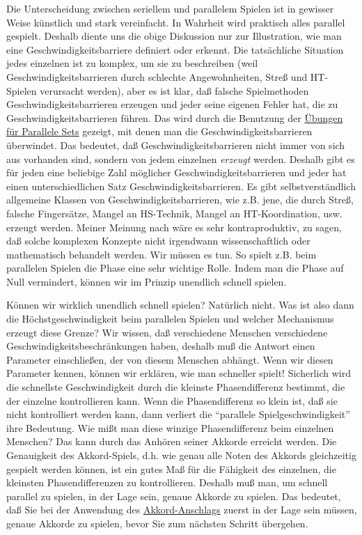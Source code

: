 Die Unterscheidung zwischen seriellem und parallelem Spielen ist in gewisser Weise künstlich und stark vereinfacht.
In Wahrheit wird praktisch alles parallel gespielt.
Deshalb diente uns die obige Diskussion nur zur Illustration, wie man eine Geschwindigkeitsbarriere definiert oder erkennt.
Die tatsächliche Situation jedes einzelnen ist zu komplex, um sie zu beschreiben (weil Geschwindigkeitsbarrieren durch schlechte Angewohnheiten, Streß und HT-Spielen verursacht werden), aber es ist klar, daß falsche Spielmethoden Geschwindigkeitsbarrieren erzeugen und jeder seine eigenen Fehler hat, die zu Geschwindigkeitsbarrieren führen.
Das wird durch die Benutzung der \hyperlink{c1iii7b}{Übungen für Parallele Sets} gezeigt, mit denen man die Geschwindigkeitsbarrieren überwindet.
Das bedeutet, daß Geschwindigkeitsbarrieren nicht immer von sich aus vorhanden sind, sondern von jedem einzelnen \textit{erzeugt} werden.
Deshalb gibt es für jeden eine beliebige Zahl möglicher Geschwindigkeitsbarrieren und jeder hat einen unterschiedlichen Satz Geschwindigkeitsbarrieren.
Es gibt selbstverständlich allgemeine Klassen von Geschwindigkeitsbarrieren, wie z.B. jene, die durch Streß, falsche Fingersätze, Mangel an HS-Technik, Mangel an HT-Koordination, usw. erzeugt werden.
Meiner Meinung nach wäre es sehr kontraproduktiv, zu sagen, daß solche komplexen Konzepte nicht irgendwann wissenschaftlich oder mathematisch behandelt werden.
Wir müssen es tun.
So spielt z.B. beim parallelen Spielen die Phase eine sehr wichtige Rolle.
Indem man die Phase auf Null vermindert, können wir im Prinzip unendlich schnell spielen.

Können wir wirklich unendlich schnell spielen? Natürlich nicht.
Was ist also dann die Höchstgeschwindigkeit beim parallelen Spielen und welcher Mechanismus erzeugt diese Grenze?
Wir wissen, daß verschiedene Menschen verschiedene Geschwindigkeitsbeschränkungen haben, deshalb muß die Antwort einen Parameter einschließen, der von diesem Menschen abhängt.
Wenn wir diesen Parameter kennen, können wir erklären, wie man schneller spielt!
Sicherlich wird die schnellste Geschwindigkeit durch die kleinste Phasendifferenz bestimmt, die der einzelne kontrollieren kann.
Wenn die Phasendifferenz so klein ist, daß sie nicht kontrolliert werden kann, dann verliert die \enquote{parallele Spielgeschwindigkeit} ihre Bedeutung.
Wie mißt man diese winzige Phasendifferenz beim einzelnen Menschen?
Das kann durch das Anhören seiner Akkorde erreicht werden.
Die Genauigkeit des Akkord-Spiels, d.h. wie genau alle Noten des Akkords gleichzeitig gespielt werden können, ist ein gutes Maß für die Fähigkeit des einzelnen, die kleinsten Phasendifferenzen zu kontrollieren.
Deshalb muß man, um schnell parallel zu spielen, in der Lage sein, genaue Akkorde zu spielen.
Das bedeutet, daß Sie bei der Anwendung des \hyperlink{c1ii9}{Akkord-Anschlags} zuerst in der Lage sein müssen, genaue Akkorde zu spielen, bevor Sie zum nächsten Schritt übergehen.

